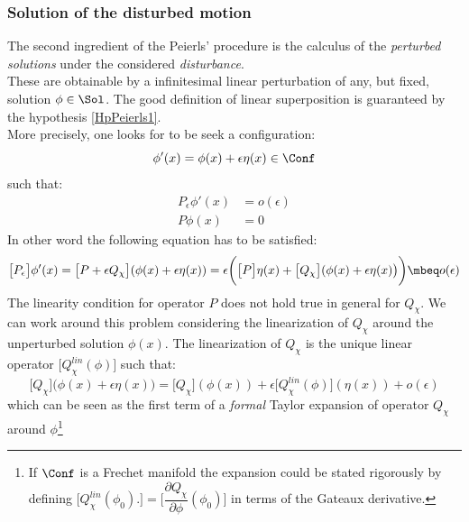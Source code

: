 \documentclass[Main]{subfiles}
\begin{document}
	\subsubsection{Solution of the disturbed motion}
		The second ingredient of the Peierls' procedure is the calculus of the \emph{perturbed solutions} under the considered \emph{disturbance}.
		\\
		These are obtainable by a infinitesimal linear perturbation of any, but fixed, solution $\phi \in \Sol$. The good definition of linear superposition is guaranteed by the hypothesis \ref{HpPeierls1}.
		\\
		More precisely, one looks for to be seek a configuration:
			\begin{displaymath}
					\phi'(x) = \phi(x) + \epsilon \eta(x) \in \Conf
			\end{displaymath}
		such that:
			\begin{align*} 
				P_\epsilon \phi'(x) &= o(\epsilon)  \\ 
				P \phi(x) &= 0
			\end{align*}
		In other word the following equation has to be satisfied:
		\begin{displaymath}
			\big[P_\epsilon\big] \phi'(x) = \big[ P + \epsilon Q_\chi		\big]( \phi(x) + \epsilon \eta(x)) 
			= \epsilon \biggr( \big[P\big] \eta(x) + \big[Q_\chi \big]( \phi(x) + \epsilon \eta(x)\big)\biggr) \mbeq o(\epsilon)			
		\end{displaymath}
		The linearity condition for operator $P$ does not hold true in general for $Q_\chi$.
		We can work around this problem considering the linearization\cite[pag. 31]{Khavkine2014} of $Q_\chi$ around the unperturbed solution $\phi(x)$. 
		The linearization of $Q_\chi$ is the unique linear operator $\big[Q_\chi^{lin}(\phi) \big]$ such that:
		\begin{displaymath}
			\big[Q_\chi \big]( \phi(x) + \epsilon \eta(x)\big)= \big[Q_\chi \big]( \phi(x)) + \epsilon \big[Q_\chi^{lin}(\phi)  \big]( \eta(x)) + o(\epsilon)
		\end{displaymath}
		which can be seen as the first term of a \emph{formal} Taylor expansion of operator $Q_\chi$ around $\phi$\footnote{If $\Conf$ is a Frechet manifold the expansion could be stated rigorously by defining $\big[Q_\chi^{lin}(\phi_0) . \big] = \big[\dfrac{\partial Q_\chi}{\partial \phi} (\phi_0)\big] $ in terms of the Gateaux derivative.}
\end{document}

